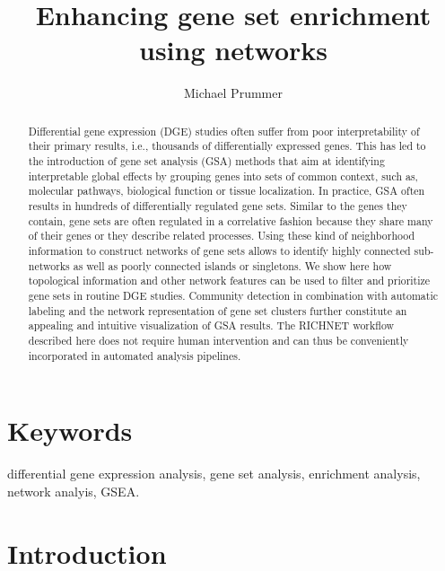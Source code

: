 \documentclass[9pt,a4paper,]{extarticle}
\theoremstyle{definition}
\theoremstyle{definition}
\theoremstyle{definition}
\theoremstyle{remark}
\begin{document}
\pagestyle{front}

\title{Enhancing gene set enrichment using networks}

\author[1]{Michael Prummer}

\maketitle
\thispagestyle{front}

\begin{abstract}
Differential gene expression (DGE) studies often suffer from poor interpretability of their primary results, i.e., thousands of differentially expressed genes. This has led to the introduction of gene set analysis (GSA) methods that aim at identifying interpretable global effects by grouping genes into sets of common context, such as, molecular pathways, biological function or tissue localization. In practice, GSA often results in hundreds of differentially regulated gene sets. Similar to the genes they contain, gene sets are often regulated in a correlative fashion because they share many of their genes or they describe related processes. Using these kind of neighborhood information to construct networks of gene sets allows to identify highly connected sub-networks as well as poorly connected islands or singletons. We show here how topological information and other network features can be used to filter and prioritize gene sets in routine DGE studies. Community detection in combination with automatic labeling and the network representation of gene set clusters further constitute an appealing and intuitive visualization of GSA results. The RICHNET workflow described here does not require human intervention and can thus be conveniently incorporated in automated analysis pipelines.
\end{abstract}

\section*{Keywords}
differential gene expression analysis, gene set analysis, enrichment analysis, network analyis, GSEA.


\clearpage
\pagestyle{main}

\section{Introduction}\label{introduction}
\end{document}
